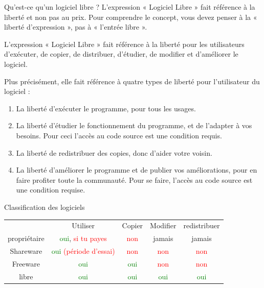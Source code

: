 \documentclass[10pt]{beamer}
\begin{document}
\begin{frame}[fragile]{Qu'est-ce qu'un logiciel libre ?}
L'expression « Logiciel Libre » fait référence à la liberté et non pas au prix. Pour
comprendre le concept, vous devez penser à la « liberté d'expression », pas à «
l'entrée libre ».

L'expression  «  Logiciel  Libre   »  fait  référence   à  la  liberté  pour   les utilisateurs
d'exécuter, de copier, de distribuer, d'étudier, de modifier et d'améliorer le logiciel.
\end{frame}
\begin{frame}

Plus précisément, elle fait référence à quatre types de liberté pour l'utilisateur du
logiciel :

\begin{definition}
	\begin{enumerate}
		\item La liberté d'exécuter le programme, pour tous les usages.
		\item La liberté d'étudier le fonctionnement du programme, et de l'adapter à vos besoins. Pour ceci l'accès au code source est une condition requis.
		\item La liberté de redistribuer des copies, donc d'aider votre voisin.
		\item La liberté d'améliorer le programme et de publier vos améliorations, pour en faire profiter toute la communauté. Pour se faire, l'accès au code source est une condition requise.
	\end{enumerate}
\end{definition}
\end{frame}

\begin{frame}{Classification des logiciels}
	\begin{tabular}{c|cccc}
			& Utiliser & Copier & Modifier & redistribuer \\
	propriétaire & \textcolor{green}{oui}, \textcolor{red}{si tu payes} & \textcolor{red}{non} & jamais & jamais \\
	Shareware & \textcolor{green}{oui} \textcolor{red}{(période d'essai)} & \textcolor{red}{non} & \textcolor{red}{non} & \textcolor{red}{non} \\
	Freeware & \textcolor{green}{oui} & \textcolor{green}{oui} & \textcolor{red}{non} & \textcolor{red}{non}\\
	libre & \textcolor{green}{oui} & \textcolor{green}{oui} & \textcolor{green}{oui} & \textcolor{green}{oui}
	\end{tabular}
\end{frame}
\end{document}
